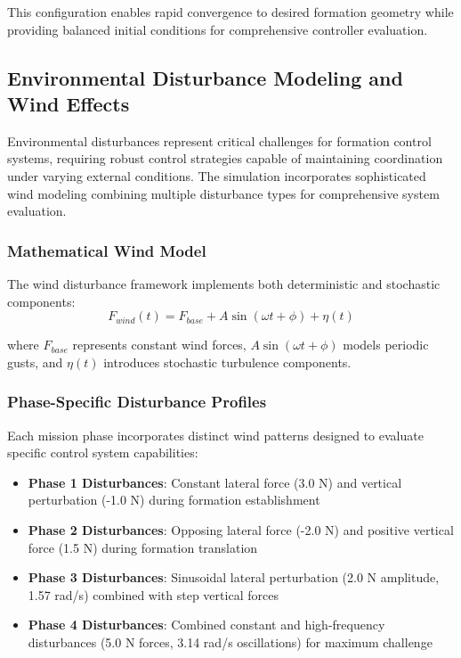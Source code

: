 This configuration enables rapid convergence to desired formation geometry while providing balanced initial conditions for comprehensive controller evaluation.

\subsection*{Environmental Disturbance Modeling and Wind Effects}

Environmental disturbances represent critical challenges for formation control systems, requiring robust control strategies capable of maintaining coordination under varying external conditions. The simulation incorporates sophisticated wind modeling combining multiple disturbance types for comprehensive system evaluation.

\subsubsection*{Mathematical Wind Model}

The wind disturbance framework implements both deterministic and stochastic components:
\begin{equation}
F_{wind}(t) = F_{base} + A \sin(\omega t + \phi) + \eta(t)
\end{equation}

where $F_{base}$ represents constant wind forces, $A \sin(\omega t + \phi)$ models periodic gusts, and $\eta(t)$ introduces stochastic turbulence components.

\subsubsection*{Phase-Specific Disturbance Profiles}

Each mission phase incorporates distinct wind patterns designed to evaluate specific control system capabilities:

\begin{itemize}
    \item \textbf{Phase 1 Disturbances}: Constant lateral force (3.0 N) and vertical perturbation (-1.0 N) during formation establishment
    \item \textbf{Phase 2 Disturbances}: Opposing lateral force (-2.0 N) and positive vertical force (1.5 N) during formation translation
    \item \textbf{Phase 3 Disturbances}: Sinusoidal lateral perturbation (2.0 N amplitude, 1.57 rad/s) combined with step vertical forces
    \item \textbf{Phase 4 Disturbances}: Combined constant and high-frequency disturbances (5.0 N forces, 3.14 rad/s oscillations) for maximum challenge
\end{itemize}

